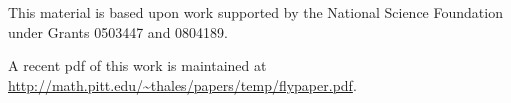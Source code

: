 \noindent

\bigskip\noindent
This material is based upon work supported by the National Science
Foundation under
Grants 0503447 and 0804189.

\bigskip\noindent\svninfo 

\bigskip\noindent
A recent pdf of this work is maintained at \url{http://math.pitt.edu/~thales/papers/temp/flypaper.pdf}.




\smallskip
\newpage

